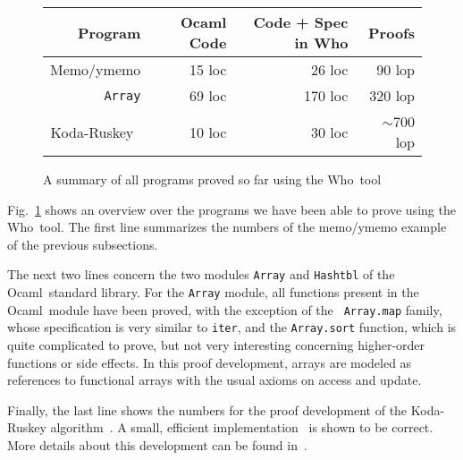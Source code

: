 \documentclass[a4paper]{llncs}
\newcommand{\who}{Who}
\newcommand{\ocaml}{Ocaml}
\begin{document}
\begin{figure}[tbp]
\begin{center}
    \begin{tabular}{ | r | r | r | r |}
    \hline
    Program & Ocaml Code & Code + Spec in \who & Proofs \\ \hline
    Memo/ymemo & 15 loc & 26 loc & 90 lop  \\ \hline
    {\tt Array} & 69 loc & 170 loc  & 320 lop  \\ \hline
    Koda-Ruskey~\cite{KanigFilliatre09wml} & 10 loc & 30 loc & $\sim$700 lop  \\ \hline
    \end{tabular}
\end{center}
  \caption{A summary of all programs proved so far using the \who\ tool}
  \label{fig:whoproofs}
\end{figure}

Fig.~\ref{fig:whoproofs} shows an overview over the programs we have been able
to prove using the \who\ tool. The first line summarizes the numbers of the
memo/ymemo example of the previous subsections. 

The next two lines concern the two modules {\tt Array} and {\tt Hashtbl} of
the \ocaml\ standard library. For the {\tt Array} module, all functions
present in the \ocaml\ module have been proved, with the exception of the {\tt
Array.map} family, whose specification is very similar to {\tt iter}, and the
{\tt Array.sort} function, which is quite complicated to prove, but not very
interesting concerning higher-order functions or side effects. In this proof
development, arrays are modeled as references to functional arrays with the
usual axioms on access and update.


Finally, the last line shows the numbers for the proof development of the
Koda-Ruskey algorithm~\cite{KodaRuskey93}. A small, efficient
implementation~\cite{FilliatrePottier02} is shown to be correct. More details
about this development can be found in~\cite{KanigFilliatre09wml}.
\end{document}
